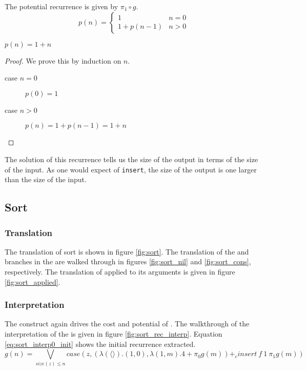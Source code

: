 The potential recurrence is given by $\pi_1 \circ g$.
\begin{equation}
  \label{eq:insert_potential}
  p(n) = \begin{cases}
    1 & n = 0 \\
    1 + p(n-1) & n > 0
  \end{cases}
\end{equation}

\begin{theorem}
  $p(n) = 1 + n$
\end{theorem}
\begin{proof}
  We prove this by induction on $n$.
  \begin{description}
    \item[case $n=0$] $p(0) = 1$
    \item[case $n>0$] $p(n) = 1 + p(n - 1) = 1 + n$
  \end{description}
\end{proof}
The solution of this recurrence tells us the size of the output in terms of the size of the input.
As one would expect of \texttt{insert}, the size of the output is one larger than the size of the input.


\subsection{Sort}



\subsubsection{Translation}
The translation of sort is shown in figure \ref{fig:sort}.
The translation of the  and  branches in the  are walked through in figures \ref{fig:sort_nil} and \ref{fig:sort_cons}, respectively.
The translation of  applied to its arguments is given in figure \ref{fig:sort_applied}.


\subsubsection{Interpretation}
The  construct again drives the cost and potential of .
The walkthrough of the interpretation of the  is given in figure \ref{fig:sort_rec_interp}.
Equation \ref{eq:sort_interp0_init} shows the initial recurrence extracted.
\begin{equation}
  \label{eq:sort_interp0_init}
  g(n) = \bigvee_{size(z)\leq n} case(z,(\lambda(\langle\rangle).(1,0),\lambda(1,m).4 + \pi_0 g(m)) +_c insert\ f\ 1\ \pi_1g(m))
\end{equation}

